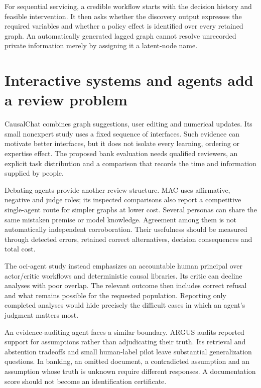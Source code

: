 For sequential servicing, a credible workflow starts with the decision history
and feasible intervention. It then asks whether the discovery output expresses
the required variables and whether a policy effect is identified over every
retained graph. An automatically generated lagged graph cannot resolve
unrecorded private information merely by assigning it a latent-node name.

\section{Interactive systems and agents add a review problem}

CausalChat combines graph suggestions, user editing and numerical updates.
Its small nonexpert study uses a fixed sequence of interfaces.
\citep{v12_la_2410_14146} Such evidence can motivate better interfaces, but it does
not isolate every learning, ordering or expertise effect. The proposed bank
evaluation needs qualified reviewers, an explicit task distribution and a
comparison that records the time and information supplied by people.

Debating agents provide another review structure. MAC uses affirmative,
negative and judge roles; its inspected comparisons also report a competitive
single-agent route for simpler graphs at lower cost. \citep{v12_la_2407_15073}
Several personas can share the same mistaken premise or model knowledge.
Agreement among them is not automatically independent corroboration. Their
usefulness should be measured through detected errors, retained correct
alternatives, decision consequences and total cost.

The oci-agent study instead emphasizes an accountable human principal over
actor/critic workflows and deterministic causal libraries. Its critic can
decline analyses with poor overlap. \citep{v12_la_2607_22443} The relevant outcome
then includes correct refusal and what remains possible for the requested
population. Reporting only completed analyses would hide precisely the
difficult cases in which an agent's judgment matters most.

An evidence-auditing agent faces a similar boundary. ARGUS audits reported
support for assumptions rather than adjudicating their truth. Its retrieval
and abstention tradeoffs and small human-label pilot leave substantial
generalization questions. \citep{v12_la_2609_30867} In banking, an omitted document,
a contradicted assumption and an assumption whose truth is unknown require
different responses. A documentation score should not become an identification
certificate.

